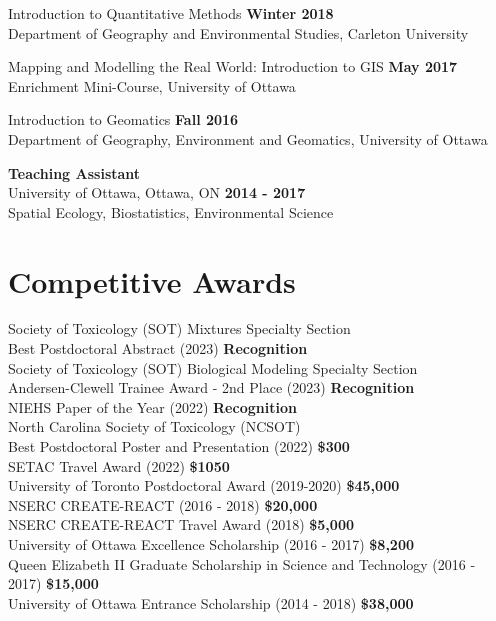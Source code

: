 \documentclass[margin,line]{res}
\begin{document}
\begin{resume}
Introduction to Quantitative Methods
 \hfill {\textbf{Winter 2018}}\\
Department of Geography and Environmental Studies, Carleton University

Mapping and Modelling the Real World: Introduction to GIS \hfill {\textbf{May 2017}}\\
Enrichment Mini-Course, University of Ottawa

Introduction to Geomatics
\hfill {\textbf{Fall 2016}}\\
Department of Geography, Environment and Geomatics, University of Ottawa

\textbf{Teaching Assistant }\\
University of Ottawa, Ottawa, ON
\hfill {\textbf{2014 - 2017}}\\
Spatial Ecology, Biostatistics, Environmental Science

\vspace*{.1in}

\section{\sc Competitive Awards}

Society of Toxicology (SOT) Mixtures Specialty Section\\
Best Postdoctoral Abstract (2023)
\hfill {\textbf{Recognition}}\\
Society of Toxicology (SOT) Biological Modeling Specialty Section\\
Andersen-Clewell Trainee Award - 2nd Place (2023)
\hfill {\textbf{Recognition}}\\
NIEHS Paper of the Year (2022)
\hfill {\textbf{Recognition}}\\
North Carolina Society of Toxicology (NCSOT)\\
Best Postdoctoral Poster and Presentation (2022)
\hfill {\textbf{\$300}}\\
SETAC Travel Award (2022)
\hfill {\textbf{\$1050}}\\
University of Toronto Postdoctoral Award (2019-2020)
\hfill {\textbf{\$45,000}}\\
NSERC CREATE-REACT (2016 - 2018)
\hfill {\textbf{\$20,000}}\\
NSERC CREATE-REACT Travel Award (2018)
\hfill {\textbf{\$5,000}}\\
University of Ottawa Excellence Scholarship (2016 - 2017)
\hfill {\textbf{\$8,200}}\\
Queen Elizabeth II Graduate Scholarship in Science and Technology (2016 - 2017)
\hfill {\textbf{\$15,000}}\\
University of Ottawa Entrance Scholarship (2014 - 2018)
\hfill {\textbf{\$38,000}}\\


\end{resume}
\end{document}
